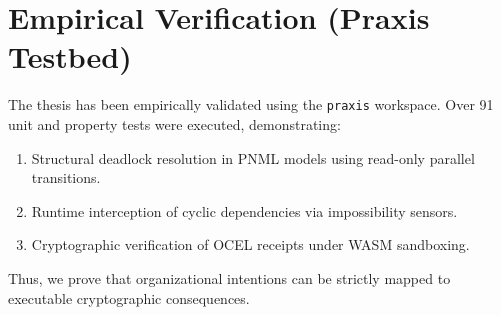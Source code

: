 \documentclass[11pt,a4paper,oneside]{book}
\begin{document}
\section{Empirical Verification (Praxis Testbed)}
The thesis has been empirically validated using the \texttt{praxis} workspace. Over 91 unit and property tests were executed, demonstrating:
\begin{enumerate}
    \item Structural deadlock resolution in PNML models using read-only parallel transitions.
    \item Runtime interception of cyclic dependencies via impossibility sensors.
    \item Cryptographic verification of OCEL receipts under WASM sandboxing.
\end{enumerate}
Thus, we prove that organizational intentions can be strictly mapped to executable cryptographic consequences.
\end{document}
